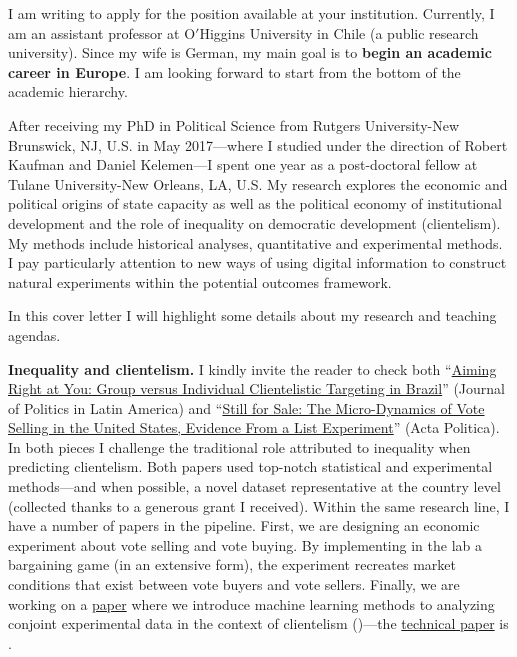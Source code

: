 \vspace{-0.3cm}I am writing to apply for the position available at your institution. Currently, I am an assistant professor at O$'$Higgins University in Chile (a public research university). Since my wife is German, my main goal is to {\bf begin an academic career in Europe}. I am looking forward to start from the bottom of the academic hierarchy. 

After receiving my PhD in Political Science from Rutgers University-New Brunswick, NJ, U.S. in May 2017---where I studied under the direction of Robert Kaufman and Daniel Kelemen---I spent one year as a post-doctoral fellow at Tulane University-New Orleans, LA, U.S. My research explores the economic and political origins of state capacity as well as the political economy of institutional development and the role of inequality on democratic development (clientelism). My methods include historical analyses, quantitative and experimental methods. I pay particularly attention to new ways of using digital information to construct natural experiments within the potential outcomes framework. 

In this cover letter I will highlight some details about my research and teaching agendas. 



{\bf Inequality and clientelism.} I kindly invite the reader to check both ``\href{https://journals.sub.uni-hamburg.de/giga/jpla/article/view/1121/1128}{Aiming Right at You: Group versus Individual Clientelistic Targeting in Brazil}'' (Journal of Politics in Latin America) and ``\href{https://doi.org/10.1057/s41269-020-00174-4}{Still for Sale: The Micro-Dynamics of Vote Selling in the United States, Evidence From a List Experiment}'' (Acta Politica). In both pieces I challenge the traditional role attributed to inequality when predicting clientelism. Both papers used top-notch statistical and experimental methods---and when possible, a novel dataset representative at the country level (collected thanks to a generous grant I received). Within the same research line, I have a number of papers in the pipeline. First, we are designing an economic experiment about vote selling and vote buying. By implementing in the lab a bargaining game (in an extensive form), the experiment recreates market conditions that exist between vote buyers and vote sellers. Finally, we are working on a \href{https://github.com/hbahamonde/Conjoint_US/raw/master/Bahamonde_Quininao_Conjoint.pdf}{paper} where we introduce machine learning methods to analyzing conjoint experimental data in the context of clientelism ({\unskip})---the \href{https://github.com/hbahamonde/Conjoint_US/raw/master/Bahamonde_Quininao_Conjoint_Letter_PA.pdf}{technical paper} is {\unskip}.


